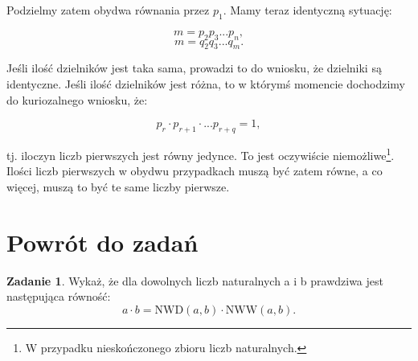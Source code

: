 \documentclass[11pt]{article}
\theoremstyle{definition}
\newtheorem{zad}{Zadanie}
\numberwithin{zad}{section}
\renewcommand*{\proofname}{Rozwiązanie}
\begin{document}
Podzielmy zatem obydwa równania przez $p_1$. Mamy teraz identyczną sytuację:

$$m = p_2p_3...p_n,$$
$$m = q_2q_3...q_m.$$

Jeśli ilość dzielników jest taka sama, prowadzi to do wniosku, że dzielniki są identyczne. Jeśli ilość dzielników jest różna, to w którymś momencie dochodzimy do kuriozalnego wniosku, że:

$$p_r\cdot p_{r+1}\cdot...p_{r+q} = 1,$$

tj. iloczyn liczb pierwszych jest równy jedynce. To jest oczywiście niemożliwe\footnote{W przypadku nieskończonego zbioru liczb naturalnych.}. Ilości liczb pierwszych w obydwu przypadkach muszą być zatem równe, a co więcej, muszą to być te same liczby pierwsze.
\renewcommand*{\proofname}{Rozwiązanie}

\section{Powrót do zadań}

\begin{zad}
Wykaż, że dla dowolnych liczb naturalnych a i b prawdziwa jest następująca równość:
\begin{equation}
a\cdot b = \text{NWD}(a,b)\cdot\text{NWW}(a,b).\label{nww}
\end{equation}
\end{zad}
\end{document}
